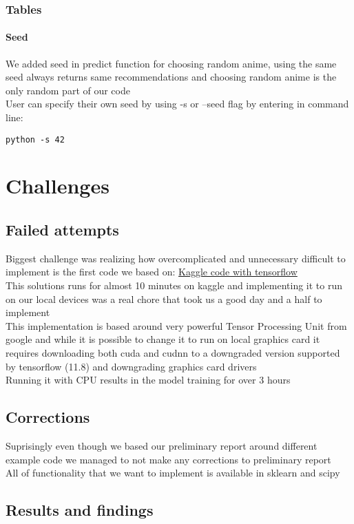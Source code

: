 \documentclass[12pt]{article}
\begin{document}
\subsubsection{Tables}
\paragraph{Seed} We added seed in predict function for choosing random anime, using the same seed always returns same recommendations and choosing random anime is the only random part of our code \\ 
User can specify their own seed by using -s or --seed flag by entering in command line:
\begin{lstlisting}
python -s 42
\end{lstlisting}
\section{Challenges}
\subsection{Failed attempts}
Biggest challenge was realizing how overcomplicated and unnecessary difficult to implement is the first code we based on: \href{https://www.kaggle.com/code/chaitanya99/recommendation-system-cf-anime}{Kaggle code with tensorflow} \\ 
This solutions runs for almost 10 minutes on kaggle and implementing it to run on our local devices was a real chore that took us a good day and a half to implement \\
This implementation is based around very powerful Tensor Processing Unit from google and while it is possible to change it to run on local graphics card it requires downloading both cuda and cudnn to a downgraded version supported by tensorflow (11.8) and downgrading graphics card drivers \\ 
Running it with CPU results in the model training for over 3 hours 
\subsection{Corrections}
Suprisingly even though we based our preliminary report around different example code we managed to not make any corrections to preliminary report \\ 
All of functionality that we want to implement is available in sklearn and scipy 
\subsection{Results and findings}
\end{document}
